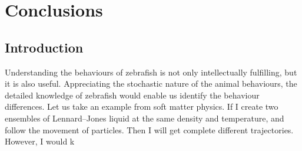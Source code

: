 \documentclass[11pt,twoside]{report}
\begin{document}
\chapter{Conclusions}
\label{chapter:conclusion}

\section{Introduction}

Understanding the behaviours of zebrafish is not only intellectually fulfilling, but it is also useful. Appreciating the stochastic nature of the animal behaviours, the detailed knowledge of zebrafish would enable us identify the behaviour differences. Let us take an example from soft matter physics. If I create two ensembles of Lennard--Jones liquid at the same density and temperature, and follow the movement of particles. Then I will get complete different trajectories. However, I would k
\end{document}
